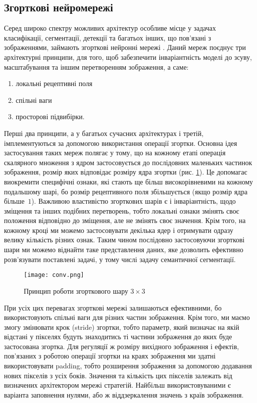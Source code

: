 \subsection{Згорткові нейромережі}

Серед широко спектру
можливих архітектур особливе місце у задачах класифікації, сегментації,
детекції та багатьох інших, що пов'язані з зображеннями, займають
згорткові нейронні мережі \cite{lecun1998gradient}. Даний мереж поєднує
три архітектурні принципи, для того, щоб забезпечити інваріантність
моделі до зсуву, масштабування та іншим перетворенням зображення, а саме:
\begin{enumerate}
    \item локальні рецептивні поля
    \item спільні ваги
    \item просторові підвибірки.
\end{enumerate}

Перші два принципи, а у багатьох сучасних архітектурах і третій,
імплементуються за допомогою використання операції згортки.
Основна ідея застосування таких мереж полягає у тому, що на кожному етапі
операція скалярного множення з ядром застосовується до послідовних маленьких
частинок зображення, розмір яких відповідає розміру ядра згортки (рис. \ref{fig:conv2d}).
Це допомагає виокремити специфічні ознаки, які стають ще більш високорівневими
на кожному подальшому шарі, бо розмір рецептивного поля збільшується (якщо розмір
ядра більше~$1$).
Важливою властивістю згорткових шарів є і інваріантність, щодо
зміщення та інших подібних перетворень, тобто локальні ознаки змінять
своє положення відповідно до зміщення, але не змінять своє значення.
Крім того, на кожному кроці ми можемо застосовувати
декілька ядер і отримувати одразу велику кількість різних ознак.
Таким чином послідовно застосовуючи згорткові шари ми можемо віднайти
таке представлення даних, яке дозволить ефективно розв'язувати поставлені задачі,
у тому числі задачу семантичної сегментації.

\begin{figure}[!ht]
    \centering
    \texttt{[image: conv.png]}
    \caption{Принцип роботи згорткового шару $3 \times 3$ \cite{trung2019automated}}
    \label{fig:conv2d}
\end{figure}

При усіх цих перевагах згорткові мережі залишаються ефективними,
бо використовують спільні ваги для різних частин зображення.
Крім того, ми маємо змогу змінювати крок (stride) згортки, тобто параметр,
який визначає на якій відстані у пікселях будуть знаходитись ті частини
зображення до яких буде застосована згортка.
Для регуляції ж розміру вихідного зображення і ефектів, пов'язаних з
роботою операції згортки на краях зображення ми здатні використовувати
padding, тобто розширення зображення за допомогою додавання нових
пікселів з усіх боків. Значення та кількість цих пікселів залежать від
визначених архітектором мережі стратегій. Найбільш використовуваними є
варіанта заповнення нулями, або ж віддзеркалення значень з країв зображення.

